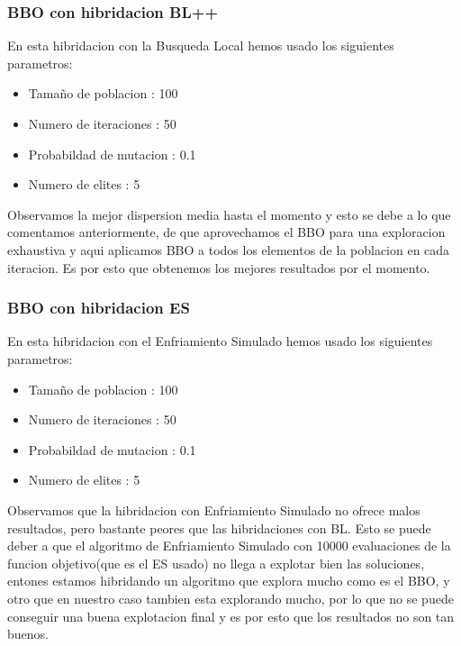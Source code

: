 \documentclass{article}
\begin{document}
\vspace{3mm}
\subsubsection{BBO con hibridacion BL++}
En esta hibridacion con la Busqueda Local hemos usado los siguientes parametros:
\begin{itemize}
	\item{Tamaño de poblacion : 100}
	\item{Numero de iteraciones : 50}
	\item{Probabildad de mutacion : 0.1}
	\item{Numero de elites : 5}
\end{itemize}

\vspace{3mm}
Observamos la mejor dispersion media hasta el momento y esto se debe a lo que comentamos anteriormente, de que 
aprovechamos el BBO para una exploracion exhaustiva y aqui aplicamos BBO a todos los elementos de la poblacion en 
cada iteracion. Es por esto que obtenemos los mejores resultados por el momento.

\vspace{3mm}
\subsubsection{BBO con hibridacion ES}
En esta hibridacion con el Enfriamiento Simulado hemos usado los siguientes parametros:
\begin{itemize}
	\item{Tamaño de poblacion : 100}
	\item{Numero de iteraciones : 50}
	\item{Probabildad de mutacion : 0.1}
	\item{Numero de elites : 5}
\end{itemize}

\vspace{3mm}
Observamos que la hibridacion con Enfriamiento Simulado no ofrece malos resultados, pero bastante peores que 
las hibridaciones con BL. Esto se puede deber a que el algoritmo de Enfriamiento Simulado con 10000 evaluaciones de la funcion 
objetivo(que es el ES usado) no llega a explotar bien las soluciones, entones estamos hibridando un algoritmo que explora 
mucho como es el BBO, y otro que en nuestro caso tambien esta explorando mucho, por lo que no se puede conseguir una buena
explotacion final y es por esto que los resultados no son tan buenos.
\end{document}
